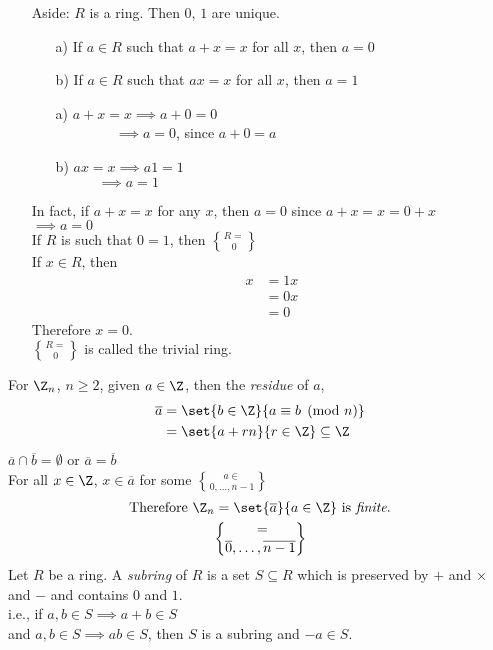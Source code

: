 \begin{itemize}
\item[Aside:]
\remark $R$ is a ring.  Then $0$, $1$ are unique.
\begin{enumerate}
\item[a)] If $a\in R$ such that $a+x=x$ for all $x$, then $a=0$
\item[b)] If $a\in R$ such that $ax=x$ for all $x$, then $a=1$
\end{enumerate}
\pf
\begin{enumerate}
\item[a)] $a+x=x \implies a+0 = 0$ \\
$\phantom{a+x=x} \implies a=0$, since $a+0=a$
\item[b)] $ax=x \implies a1=1$ \\
$\phantom{ax=x} \implies a=1$
\end{enumerate}
\note In fact, if $a+x=x$ for any $x$, then $a=0$ since $a+x=x=0+x$ \\
$\implies a=0$ \\
\note If $R$ is such that $0=1$, then $R=\brace0$ \\
\pf If $x\in R$, then
\begin{align*}
x &= 1x \\
&= 0x \\
&= 0
\end{align*}
Therefore $x=0$. \\
$R=\brace0$ is called the trivial ring.
\end{itemize}
For $\Z_n$, $n\geq2$, given $a\in\Z$, then the \emph{residue} of $a$,
\begin{align*}
\overline a &= \set{b\in\Z}{a\equiv b\pmod n} \\
&= \set{a+rn}{r\in\Z}\subseteq\Z
\end{align*}
\note $\overline a\cap\overline b=\emptyset$ or $\overline a=\overline b$ \\
\note For all $x\in\Z$, $x\in\overline a$ for some $a\in\brace{0,\dotsc,n-1}$
\begin{align*}
\text{Therefore } \Z_n &= \set{\overline a}{a\in\Z} \text{ is \emph{finite}.} \\
&= \brace{\overline0,\dotsc,\overline{n-1}}
\end{align*}
 Let $R$ be a ring.  A \emph{subring} of $R$ is a set $S\subseteq R$ which is preserved by $+$ and $\times$ and $-$ and contains $0$ and $1$. \\
i.e., if $a,b\in S\implies a+b\in S$ \\
and $a,b\in S\implies ab\in S$, then $S$ is a subring and $-a\in S$. \\
